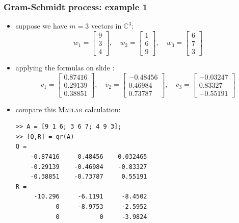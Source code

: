 \documentclass[10pt,hyperref]{beamer}
\newcommand{\CC}{\mathbb{C}}
\newcommand{\Matlab}{\textsc{Matlab}\xspace}
\begin{document}
\begin{frame}[fragile]
\frametitle{Gram-Schmidt process: example 1}

\begin{itemize}
\item suppose we have $m=3$ vectors in $\CC^3$:
\small
    $$w_1 = \begin{bmatrix} 9 \\ 3 \\ 4 \end{bmatrix}, \quad w_2 = \begin{bmatrix} 1 \\ 6 \\ 9 \end{bmatrix}, \quad w_3 = \begin{bmatrix} 6 \\ 7 \\ 3 \end{bmatrix}$$
\normalsize
\item applying the formulas on slide \pageref{GSformulas}:
\small
    $$v_1 = \begin{bmatrix} 0.87416 \\ 0.29139 \\ 0.38851 \end{bmatrix}, \quad v_2 = \begin{bmatrix} -0.48456 \\ 0.46984 \\ 0.73787 \end{bmatrix}, \quad v_3 = \begin{bmatrix} -0.03247 \\ 0.83327 \\ -0.55191 \end{bmatrix}$$
\normalsize
\item compare this \Matlab calculation:
\begin{Verbatim}[fontsize=\scriptsize]
>> A = [9 1 6; 3 6 7; 4 9 3];
>> [Q,R] = qr(A)
Q =
    -0.87416     0.48456    0.032465
    -0.29139    -0.46984    -0.83327
    -0.38851    -0.73787     0.55191
R =
     -10.296     -6.1191     -8.4502
           0     -8.9753     -2.5952
           0           0     -3.9824
\end{Verbatim}
\end{itemize}
\end{frame}
\end{document}
